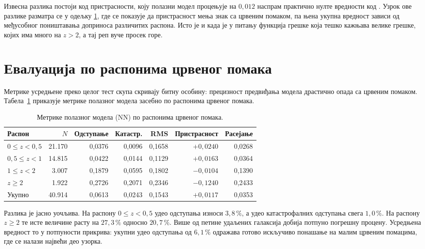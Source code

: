 \documentclass[12pt,oneside]{memoir}
\begin{document}
Извесна разлика постоји код пристрасности, коју полазни модел процењује на
$0{,}012$ наспрам практично нулте вредности код \cite{jones2024a}. Узрок
ове разлике разматра се у одељку \ref{sec:rez-binovi}, где се показује да пристрасност мења знак
са црвеним помаком, па њена укупна вредност зависи од међусобног поништавања
доприноса различитих распона.
Исто је и када је у питању функција грешке која тешко кажњава велике грешке, којих има
много на $z>2$, а тај реп вуче просек горе.

\section{Евалуација по распонима црвеног помака}
\label{sec:rez-binovi}

Метрике усредњене преко целог тест скупа скривају битну особину: прецизност предвиђања модела
драстично опада са црвеним помаком. Табела~\ref{tab:nn-po-rasponima} приказује
метрике полазног модела засебно по распонима црвеног помака.

\begin{table}[htbp]
\centering
\caption{Метрике полазног модела (NN) по распонима црвеног помака.}
\label{tab:nn-po-rasponima}
\begin{tabular}{lrrrrrr}
\toprule
Распон & $N$ & Одступање & Катастр. & RMS & Пристрасност & Расејање \\
\midrule
$0 \le z < 0{,}5$ & 21.170 & 0,0376 & 0,0096 & 0,1658 & $+0{,}0240$ & 0,0268 \\
$0{,}5 \le z < 1$ & 14.815 & 0,0422 & 0,0144 & 0,1129 & $+0{,}0163$ & 0,0364 \\
$1 \le z < 2$     &  3.007 & 0,1879 & 0,0595 & 0,1802 & $-0{,}0104$ & 0,1390 \\
$z \ge 2$         &  1.922 & 0,2726 & 0,2071 & 0,2346 & $-0{,}1240$ & 0,2433 \\
\midrule
Укупно            & 40.914 & 0,0613 & 0,0243 & 0,1543 & $+0{,}0117$ & 0,0353 \\
\bottomrule
\end{tabular}
\end{table}

Разлика је јасно уочљива. На распону $0 \le z < 0{,}5$ удео одступања износи
$3{,}8\,\%$, а удео катастрофалних одступања свега $1{,}0\,\%$. На распону
$z \ge 2$ те исте величине расту на $27{,}3\,\%$ односно $20{,}7\,\%$.
Више од петине удаљених галаксија добија потпуно погрешну процену.
Усредњена вредност то у потпуности прикрива: укупни удео одступања од
$6{,}1\,\%$ одражава готово искључиво понашање на малим црвеним помацима, где
се налази највећи део узорка.
\end{document}
